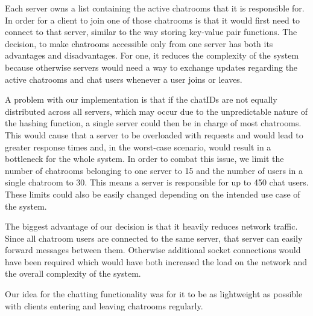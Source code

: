 Each server owns a list containing the active chatrooms that it is responsible for. In order for a client to join one of those chatrooms is that it would first need to connect to that server, similar to the way storing key-value pair functions. The decision, to make chatrooms accessible only from one server has both its advantages and disadvantages. For one, it reduces the complexity of the system because otherwise servers would need a way to exchange updates regarding the active chatrooms and chat users whenever a user joins or leaves.

A problem with our implementation is that if the chatIDs are not equally distributed across all servers, which may occur due to the unpredictable nature of the hashing function, a single server could then be in charge of most chatrooms. This would cause that a server to be overloaded with requests and would lead to greater response times and, in the worst-case scenario, would result in a bottleneck for the whole system. In order to combat this issue, we limit the number of chatrooms belonging to one server to 15 and the number of users in a single chatroom to 30. This means a server is responsible for up to 450 chat users. These limits could also be easily changed depending on the intended use case of the system.

The biggest advantage of our decision is that it heavily reduces network traffic. Since all chatroom users are connected to the same server, that server can easily forward messages between them. Otherwise additional socket connections would have been required which would have both increased the load on the network and the overall complexity of the system.

Our idea for the chatting functionality was for it to be as lightweight as possible with clients entering and leaving chatrooms regularly.

